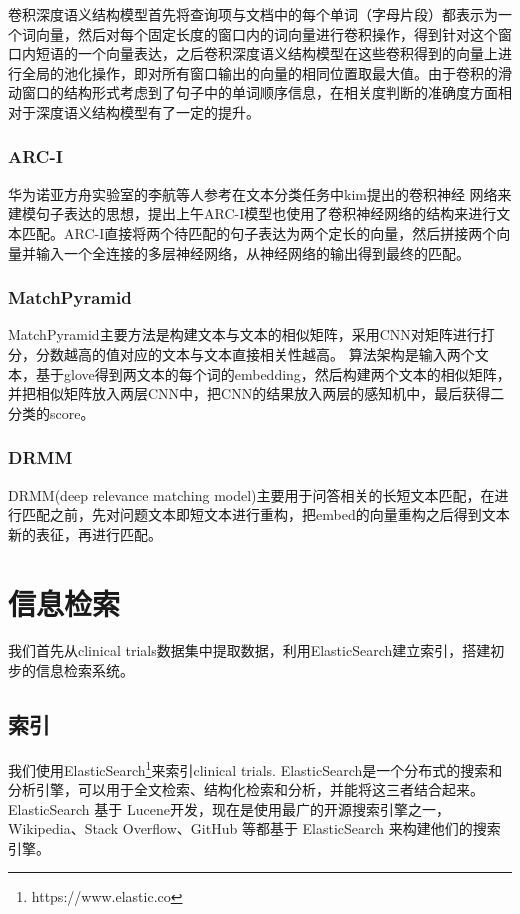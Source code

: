 \documentclass[a4paper]{article}
\begin{document}
卷积深度语义结构模型首先将查询项与文档中的每个单词（字母片段）都表示为一个词向量，然后对每个固定长度的窗口内的词向量进行卷积操作，得到针对这个窗口内短语的一个向量表达，之后卷积深度语义结构模型在这些卷积得到的向量上进行全局的池化操作，即对所有窗口输出的向量的相同位置取最大值。由于卷积的滑动窗口的结构形式考虑到了句子中的单词顺序信息，在相关度判断的准确度方面相对于深度语义结构模型有了一定的提升。

\subsubsection{ARC-I}
华为诺亚方舟实验室的李航等人参考在文本分类任务中kim提出的卷积神经
网络来建模句子表达的思想，提出上午ARC-I模型\cite{hu2014convolutional}也使用了卷积神经网络的结构来进行文本匹配。ARC-I直接将两个待匹配的句子表达为两个定长的向量，然后拼接两个向量并输入一个全连接的多层神经网络，从神经网络的输出得到最终的匹配。

\subsubsection{MatchPyramid}
MatchPyramid\cite{pang2016study}主要方法是构建文本与文本的相似矩阵，采用CNN对矩阵进行打分，分数越高的值对应的文本与文本直接相关性越高。 算法架构是输入两个文本，基于glove得到两文本的每个词的embedding，然后构建两个文本的相似矩阵，并把相似矩阵放入两层CNN中，把CNN的结果放入两层的感知机中，最后获得二分类的score。

\subsubsection{DRMM}
DRMM(deep relevance matching model)\cite{guo2016deep}主要用于问答相关的长短文本匹配，在进行匹配之前，先对问题文本即短文本进行重构，把embed的向量重构之后得到文本新的表征，再进行匹配。 
\pagebreak

\section{信息检索}
我们首先从clinical trials数据集中提取数据，利用ElasticSearch建立索引，搭建初步的信息检索系统。
\subsection{索引}
我们使用ElasticSearch\footnote{https://www.elastic.co}来索引clinical trials. ElasticSearch是一个分布式的搜索和分析引擎，可以用于全文检索、结构化检索和分析，并能将这三者结合起来。ElasticSearch 基于 Lucene开发，现在是使用最广的开源搜索引擎之一，Wikipedia、Stack Overflow、GitHub 等都基于 ElasticSearch 来构建他们的搜索引擎。
\end{document}
